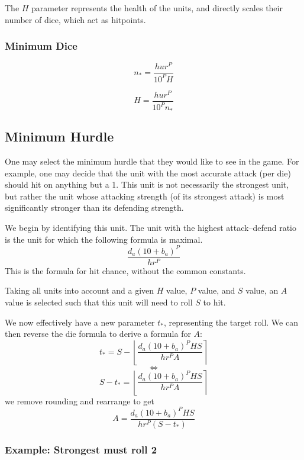 \documentclass[twocolumn]{article}
\begin{document}
The $H$ parameter represents the health of the units,
and directly scales their number of dice, which act as hitpoints.

\subsubsection{Minimum Dice}


\[
    n_* =  
        \frac
            {h u r^P}
            {10^P H}
\]

\[
    H =  
        \frac
            {h u r^P}
            {10^P n_*}
\]

\subsection{Minimum Hurdle}


One may select the minimum hurdle that they would like to see in the game.
For example, one may decide
that the unit with the most accurate attack (per die)
should hit on anything but a 1.
This unit is not necessarily the strongest unit,
but rather the unit whose attacking strength (of its strongest attack)
is most significantly stronger than
its defending strength.

We begin by identifying this unit.
The unit with the highest attack--defend ratio is the unit for which the following formula is maximal.
\[
    \frac
        {d_a (10 + b_a)^P}
        {h r^P}
\]
This is the formula for hit chance, without the common constants.

Taking all units into account and a given $H$ value, $P$ value, and $S$ value,
an $A$ value is selected such that this unit will need to roll $S$ to hit.

We now effectively have a new parameter $t_*$, representing the target roll.
We can then reverse the die formula to derive a formula for $A$:
\[
    t_* =
        S -
        \left\lfloor
            \frac
                {d_a (10 + b_{a})^P H S}
                {h r^P A}
        \right\rceil
\]
\[
    \iff
\]
\[
    S - t_* =
        \left\lfloor
            \frac
                {d_a (10 + b_{a})^P H S}
                {h r^P A}
        \right\rceil
\]
we remove rounding and rearrange to get
\[
    A = 
        \frac
            {d_a (10 + b_{a})^P H S}
            {h r^P (S - t_*)}
\]

\subsubsection{Example: Strongest must roll 2}
\end{document}
